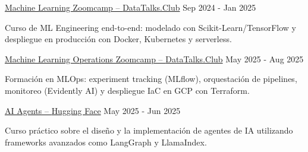 

\begin{cventries}

\cventry
    {} %
    {\href{https://drive.google.com/file/d/1T1NxRtjeb5xgFjWrEk9oTdtdPcqPQH2f/view?usp=sharing}{Machine Learning Zoomcamp -- {\normalfont DataTalks.Club}}} %
    {} %
    {Sep 2024 - Jan 2025} %
    {
      \begin{cvitems} %
        \item{Curso de ML Engineering end-to-end: modelado con Scikit-Learn/TensorFlow y despliegue en producción con Docker, Kubernetes y serverless.}
      \end{cvitems}
    }

\cventry
    {} %
    {\href{https://drive.google.com/file/d/1f6o5BkSsiKrAkRrmSggAwh3WxUNkDD7v/view?usp=sharing}{Machine Learning Operations Zoomcamp -- {\normalfont DataTalks.Club}}} %
    {} %
    {May 2025 - Aug 2025} %
    {
      \begin{cvitems}
        \item{Formación en MLOps: experiment tracking (MLflow), orquestación de pipelines, monitoreo (Evidently AI) y despliegue IaC en GCP con Terraform.}
      \end{cvitems}
    }

\cventry
  {} %
  {\href{https://drive.google.com/file/d/1Dl4U_Ee6CsA35Ysqwebf-Jcxu8C6e_KK/view?usp=sharing}{AI Agents -- {\normalfont Hugging Face}}} %
  {} %
  {May 2025 - Jun 2025} %
  {
    \begin{cvitems}
      \item{Curso práctico sobre el diseño y la implementación de agentes de IA utilizando frameworks avanzados como LangGraph y LlamaIndex.}
    \end{cvitems}
  }



\end{cventries}
